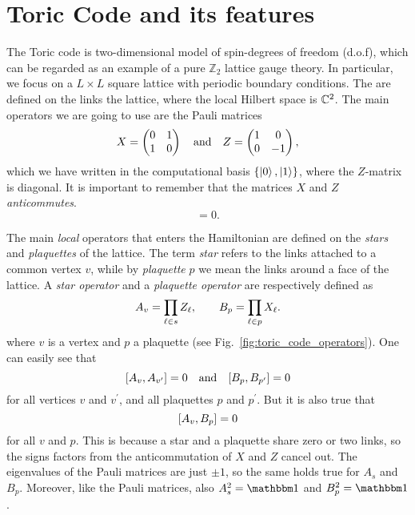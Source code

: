 \section{Toric Code and its features}
\label{sec:toric_code_and_its_features}

The Toric code is two-dimensional model of spin-\onehalf degrees of freedom (d.o.f), which can be regarded as an example of a pure $\mathbb{Z}_2$ lattice gauge theory.
In particular, we focus on a $L \times L$ square lattice with periodic boundary conditions.
The \dof are defined on the links the lattice, where the local Hilbert space is $\mathbb{C}^2$.
The main operators we are going to use are the Pauli matrices
\begin{equation}
    X = \begin{pmatrix}
        0 & 1 \\ 1 & 0
    \end{pmatrix}
    \qand
    Z = \begin{pmatrix}
        1 & 0 \\ 0 & -1
    \end{pmatrix},
    \label{eq:matrices_X_Z}
\end{equation}
which we have written in the computational basis $\{\ket{0}, \ket{1}\}$, where the $Z$-matrix is diagonal.
It is important to remember that the matrices $X$ and $Z$ \emph{anticommutes}.
\begin{equation}
    [X, Z] = 0.
\end{equation}

The main \emph{local} operators that enters the Hamiltonian are defined on the \emph{stars} and \emph{plaquettes} of the lattice.
The term \emph{star} refers to the links attached to a common vertex $v$, while by \emph{plaquette} $p$ we mean the links around a face of the lattice.
A \emph{star operator} and a \emph{plaquette operator} are respectively defined as
\begin{equation}
    A_v = \prod_{\ell \in s} Z_\ell, \qquad
    B_p = \prod_{\ell \in p} X_\ell.
    \label{eq:star_plaq_op_def}
\end{equation}
where $v$ is a vertex and $p$ a plaquette (see Fig.~\ref{fig:toric_code_operators}).
One can easily see that
\begin{equation}
    \comm{A_v}{A_{v^{\prime}}} = 0 \qand
    \comm{B_p}{B_{p^{\prime}}} = 0
    \label{eq:star_plaq_op_comm_1}
\end{equation}
for all vertices $v$ and $v^{\prime} $, and all plaquettes $p$ and $p^{\prime} $.
But it is also true that
\begin{equation}
    \comm{A_v}{B_p} = 0
    \label{eq:star_plaq_op_comm_2}
\end{equation}
for all $v$ and $p$.
This is because a star and a plaquette share zero or two links, so the signs factors from the anticommutation of $X$ and $Z$ cancel out.
The eigenvalues of the Pauli matrices are just $\pm 1$, so the same holds true for $A_s$ and $B_p$.
Moreover, like the Pauli matrices, also $A_s^2 = \identity$ and $B_p^2 = \identity$.


